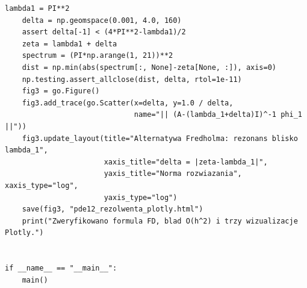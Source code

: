 \begin{lstlisting}[style=pythonpde,caption={Widmo operatora Dirichleta, ewolucje i rezonans (Plotly)},label={code:pde12-operators}]
    lambda1 = PI**2
    delta = np.geomspace(0.001, 4.0, 160)
    assert delta[-1] < (4*PI**2-lambda1)/2
    zeta = lambda1 + delta
    spectrum = (PI*np.arange(1, 21))**2
    dist = np.min(abs(spectrum[:, None]-zeta[None, :]), axis=0)
    np.testing.assert_allclose(dist, delta, rtol=1e-11)
    fig3 = go.Figure()
    fig3.add_trace(go.Scatter(x=delta, y=1.0 / delta,
                              name="|| (A-(lambda_1+delta)I)^-1 phi_1 ||"))
    fig3.update_layout(title="Alternatywa Fredholma: rezonans blisko lambda_1",
                       xaxis_title="delta = |zeta-lambda_1|",
                       yaxis_title="Norma rozwiazania", xaxis_type="log",
                       yaxis_type="log")
    save(fig3, "pde12_rezolwenta_plotly.html")
    print("Zweryfikowano formula FD, blad O(h^2) i trzy wizualizacje Plotly.")


if __name__ == "__main__":
    main()
\end{lstlisting}


